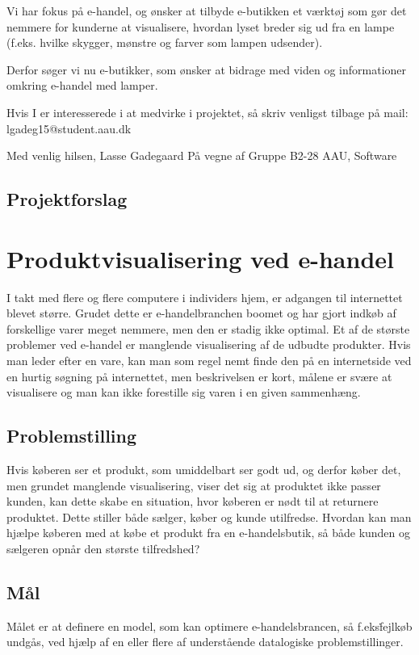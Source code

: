Vi har fokus på e-handel, og ønsker at tilbyde e-butikken et værktøj som gør det nemmere for kunderne at visualisere, hvordan lyset breder sig ud fra en lampe (f.eks. hvilke skygger, mønstre og farver som lampen udsender). 

Derfor søger vi nu e-butikker, som ønsker at bidrage med viden og informationer omkring e-handel med lamper.  

Hvis I er interesserede i at medvirke i projektet, så skriv venligst tilbage på mail: lgadeg15@student.aau.dk 

Med venlig hilsen,\newline
Lasse Gadegaard\newline
På vegne af\newline
Gruppe B2-28\newline
AAU, Software


\clearpage
\subsection{Projektforslag}
\section*{Produktvisualisering ved e-handel}
I takt med flere og flere computere i individers hjem, er adgangen til internettet blevet større. Grudet dette er e-handelbranchen boomet og har gjort indkøb af forskellige varer meget nemmere, men den er stadig ikke optimal. Et af de største problemer ved e-handel er manglende visualisering af de udbudte produkter. Hvis man leder efter en vare, kan man som regel nemt finde den på en internetside ved en hurtig søgning på internettet, men beskrivelsen er kort, målene er svære at visualisere og man kan ikke forestille sig varen i en given sammenhæng.

\subsection*{Problemstilling}
Hvis køberen ser et produkt, som umiddelbart ser godt ud, og derfor køber det, men grundet manglende visualisering, viser det sig at produktet ikke passer kunden, kan dette skabe en situation, hvor køberen er nødt til at returnere produktet. Dette stiller både sælger, køber og kunde utilfredse. Hvordan kan man hjælpe køberen med at købe et produkt fra en e-handelsbutik, så både kunden og sælgeren opnår den største tilfredshed?

\subsection*{Mål}
Målet er at definere en model, som kan optimere e-handelsbrancen, så f.eks\. fejlkøb undgås, ved hjælp af en eller flere af understående datalogiske problemstillinger.

